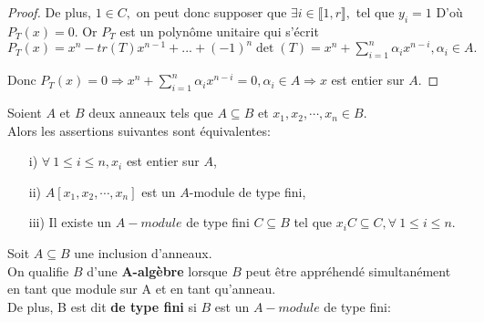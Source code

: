 \begin{proof}
	De plus, $1\in C,$ on peut donc supposer que $\exists i\in \llbracket 1, r \rrbracket ,$ tel que $y_{i}=1$
	D'où $P_{T}(x)=0.$
	Or $P_{T}$ est un polynôme unitaire qui s'écrit\\ $P_{T}(x)=x^{n}-tr(T)x^{n-1}+...+(-1)^{n}\det
	(T)=x^{n}+\sum\limits_{i=1}^{n}\alpha _{i}x^{n-i},\alpha _{i}\in A.$
	
	Donc $P_{T}(x)=0\Rightarrow x^{n}+\sum\limits_{i=1}^{n}\alpha
	_{i}x^{n-i}=0,\alpha _{i}\in A\Rightarrow x$ est entier sur $A.$
	
\end{proof}
\begin{moncorollaire}
	Soient $A$ et $B$ deux anneaux tels que $A \subseteq  B$ et $x_1, x_2, \cdots, x_n \in B$.\\
	Alors les assertions suivantes sont équivalentes: \\
	\begin{enumerate}
		\item[i)]$\forall \ 1 \leqslant i \leqslant n, x_i$ est entier sur $A$,
		\item[ii)]$A[x_1, x_2, \cdots, x_n]$ est un $A$-module de type fini,
		\item[iii)]Il existe un $A-module$ de type fini $C \subseteq  B$ tel que $x_i C \subseteq  C, \forall \ 1 \leqslant i \leqslant n$.
	\end{enumerate}
\end{moncorollaire}

\begin{madefinition}
	Soit $A \subseteq B$ une inclusion d'anneaux.\\
	On qualifie $B$ d'une \textbf{A-algèbre} lorsque $B$ peut être appréhendé simultanément en tant que module sur A et en tant qu'anneau.\\
	De plus, B est dit \textbf{de type fini} si $B$ est un $A-module$ de type fini:
\end{madefinition}

